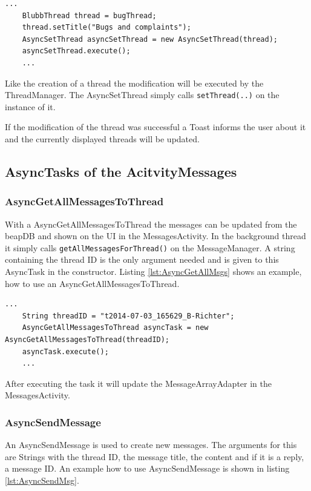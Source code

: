 \documentclass[12pt,a4paper,oneside]{report}
\newcommand{\beapDB}{beapDB}
\newcommand{\code}[1]{\lstinline{#1}}
\begin{document}
\begin{lstlisting}[caption=AsyncSetThread example, label=lst:AsyncSetThread]
	...
	BlubbThread thread = bugThread;
	thread.setTitle("Bugs and complaints");
	AsyncSetThread asyncSetThread = new AsyncSetThread(thread);
	asyncSetThread.execute();
	...
\end{lstlisting}
Like the creation of a thread the modification will be executed by the ThreadManager. The AsyncSetThread simply calls \code{setThread(..)} on the instance of it.

If the modification of the thread was successful a Toast informs the user about it and the currently displayed threads will be updated.

\subsection{AsyncTasks of the AcitvityMessages}

\subsubsection{AsyncGetAllMessagesToThread} \label{subsubsec:AsyncGetAllMessagesToThread}
With a AsyncGetAllMessagesToThread the messages can be updated from the \beapDB{} and shown on the UI in the MessagesActivity. In the background thread it simply calls \code{getAllMessagesForThread()} on the MessageManager. A string containing the thread ID is the only argument needed and is given to this AsyncTask in the constructor. Listing \ref{lst:AsyncGetAllMsgs} shows an example, how to use an AsyncGetAllMessagesToThread.
\begin{lstlisting}[caption=AsyncGetAllMessagesToThread example, label=lst:AsyncGetAllMsgs]
	...
	String threadID = "t2014-07-03_165629_B-Richter";
	AsyncGetAllMessagesToThread asyncTask = new AsyncGetAllMessagesToThread(threadID);
	asyncTask.execute();
	...
\end{lstlisting}

After executing the task it will update the MessageArrayAdapter in the MessagesActivity.

\subsubsection{AsyncSendMessage}
An AsyncSendMessage is used to create new messages. The arguments for this are Strings with the thread ID, the message title, the content and if it is a reply, a message ID. An example how to use AsyncSendMessage is shown in listing \ref{lst:AsyncSendMsg}.
\end{document}
